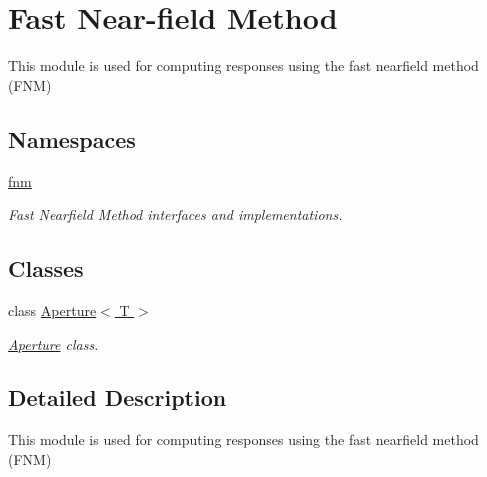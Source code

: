 \hypertarget{group__FNM}{\section{Fast Near-\/field Method}
\label{group__FNM}
}


This module is used for computing responses using the fast nearfield method (F\+N\+M)  


\subsection*{Namespaces}
\begin{DoxyCompactItemize}
\item 
 \hyperlink{namespacefnm}{fnm}
\begin{DoxyCompactList}\small\item\em Fast Nearfield Method interfaces and implementations. \end{DoxyCompactList}\end{DoxyCompactItemize}
\subsection*{Classes}
\begin{DoxyCompactItemize}
\item 
class \hyperlink{classfnm_1_1Aperture}{Aperture$<$ T $>$}
\begin{DoxyCompactList}\small\item\em \hyperlink{classfnm_1_1Aperture}{Aperture} class. \end{DoxyCompactList}\end{DoxyCompactItemize}


\subsection{Detailed Description}
This module is used for computing responses using the fast nearfield method (F\+N\+M) 

